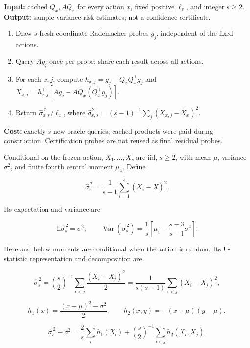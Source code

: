 \begin{algorithm}
\caption{Common-probe risk diagnostic for preconstructed actions}\label{alg:diagnostic}
\textbf{Input:} cached $Q_x,AQ_x$ for every action $x$, fixed positive $\ell_x$, and integer $s\ge2$.\\
\textbf{Output:} sample-variance risk estimates; not a confidence certificate.
\begin{enumerate}
\item Draw $s$ fresh coordinate-Rademacher probes $g_j$, independent of the fixed actions.
\item Query $Ag_j$ once per probe; share each result across all actions.
\item For each $x,j$, compute $h_{x,j}=g_j-Q_xQ_x^\top g_j$ and
$X_{x,j}=h_{x,j}^\top[Ag_j-AQ_x(Q_x^\top g_j)]$.
\item Return $\widehat\sigma_{x,s}^{\,2}/\ell_x$, where
$\widehat\sigma_{x,s}^{\,2}=(s-1)^{-1}\sum_j(X_{x,j}-\bar X_x)^2$.
\end{enumerate}
\textbf{Cost:} exactly $s$ new oracle queries; cached products were paid during construction.
Certification probes are not reused as final residual probes.
\end{algorithm}
\begin{lemma}\label{thm:T7}
Conditional on the frozen action, $X_1,\ldots,X_s$ are iid, $s\ge2$, with mean $\mu$, variance $\sigma^2$, and finite fourth central moment $\mu_4$. Define


\begin{equation}
\widehat\sigma_s^{\,2}=\frac1{s-1}\sum_{i=1}^s(X_i-\bar X)^2.
\end{equation}


Its expectation and variance are


\begin{equation}
\mathbb E\widehat\sigma_s^{\,2}=\sigma^2,\qquad
\operatorname{Var}(\widehat\sigma_s^{\,2})
=\frac1s\left[\mu_4-\frac{s-3}{s-1}\sigma^4\right].
\end{equation}


Here and below moments are conditional when the action is random. Its U-statistic representation and decomposition are


\begin{equation}
\widehat\sigma_s^{\,2}=\binom{s}{2}^{-1}\sum_{i<j}\frac{(X_i-X_j)^2}{2}
=\frac1{s(s-1)}\sum_{i<j}(X_i-X_j)^2,
\end{equation}


\begin{equation}
h_1(x)=\frac{(x-\mu)^2-\sigma^2}{2},\qquad
h_2(x,y)=-(x-\mu)(y-\mu),
\end{equation}


\begin{equation}
\widehat\sigma_s^{\,2}-\sigma^2
=\frac2s\sum_i h_1(X_i)+\binom{s}{2}^{-1}\sum_{i<j}h_2(X_i,X_j).
\end{equation}


\end{lemma}
